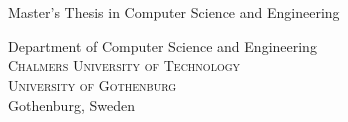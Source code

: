 
\newcommand{\oneLineTitle}{\thetitle}
\newcommand{\multiLineTitle}[1]{\thetitle}

\begin{titlepage}
			
\addtolength{\voffset}{2cm}

\begin{figure}[H]
\centering
\vspace{1cm}	%
\end{figure}

\setlength{\parindent}{0cm}

\mbox{}
\vfill
\renewcommand{\familydefault}{\sfdefault} \normalfont %

\textbf{\Huge \multiLineTitle{0.2cm}} \\[0.5cm]

{\Large \oneLineSubtitle}\\[0.5cm]


Master's Thesis in Computer Science and Engineering

\vspace{1em}

{\Large \authorfirstname{} \authorlastname{}}

\vspace{2.9cm}

Department of Computer Science and Engineering \\
\textsc{Chalmers University of Technology} \\
\textsc{University of Gothenburg} \\
Gothenburg, Sweden \the\year

\renewcommand{\familydefault}{\rmdefault} \normalfont %
\end{titlepage}


\newpage
\restoregeometry
\thispagestyle{empty}
\mbox{}



